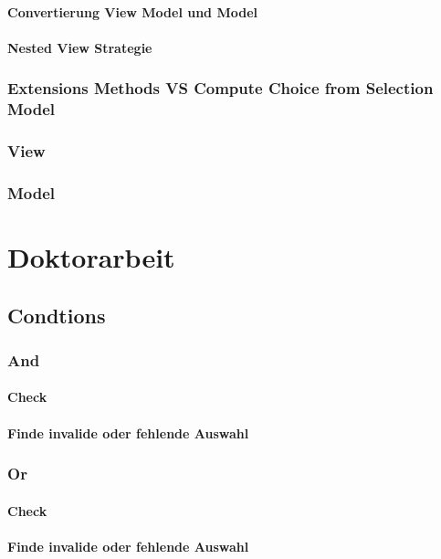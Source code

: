 \documentclass[12pt, twoside]{article}
\begin{document}
\paragraph{Convertierung View Model und Model}
\paragraph{Nested View Strategie}
\subsubsection{Extensions Methods VS Compute Choice from Selection Model}

\subsubsection{View}
\subsubsection{Model}

\section{Doktorarbeit}
\subsection{Condtions}
\subsubsection{And}
\paragraph{Check}
\paragraph{Finde invalide oder fehlende Auswahl}

\subsubsection{Or}
\paragraph{Check}
\paragraph{Finde invalide oder fehlende Auswahl}
\end{document}
